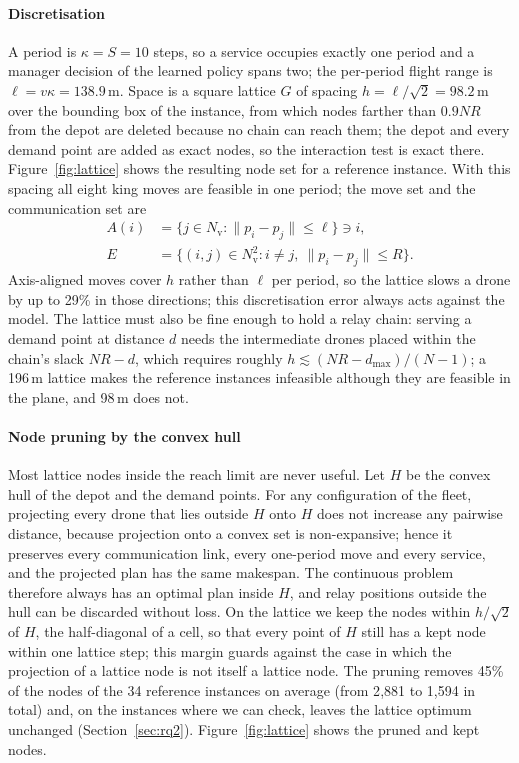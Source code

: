 \documentclass[final,5p,times,twocolumn]{elsarticle}
\begin{document}
\paragraph{Discretisation}
A period is $\kappa = S = 10$ steps, so a service occupies exactly one period and a manager
decision of the learned policy spans two; the per-period flight range is $\ell = v\kappa =
138.9$\,m. Space is a square lattice $G$ of spacing $h = \ell/\sqrt{2} = 98.2$\,m over the
bounding box of the instance, from which nodes farther than $0.9NR$ from the depot are deleted
because no chain can reach them; the depot and every demand point are added as exact nodes, so
the interaction test is exact there. Figure~\ref{fig:lattice} shows the resulting node set for a
reference instance. With this spacing all eight king moves are feasible in one period; the move
set and the communication set are
\begin{align}
A(i) &= \{ j \in N_{\mathrm{v}} : \|p_i - p_j\| \le \ell \} \ni i, \label{eq:moveset}\\
E &= \{ (i,j) \in N_{\mathrm{v}}^2 : i \ne j,\ \|p_i - p_j\| \le R \}. \label{eq:commset}
\end{align}
Axis-aligned moves cover $h$ rather than $\ell$ per period, so the lattice slows a drone by up
to 29\% in those directions; this discretisation error always acts against the model. The lattice
must also be fine enough to hold a relay chain: serving a demand point at distance $d$ needs the
intermediate drones placed within the chain's slack $NR - d$, which requires roughly
$h \lesssim (NR - d_{\max})/(N-1)$; a 196\,m lattice makes the reference instances infeasible
although they are feasible in the plane, and 98\,m does not.

\paragraph{Node pruning by the convex hull}
Most lattice nodes inside the reach limit are never useful. Let $H$ be the convex hull of the
depot and the demand points. For any configuration of the fleet, projecting every drone that lies
outside $H$ onto $H$ does not increase any pairwise distance, because projection onto a convex
set is non-expansive; hence it preserves every communication link, every one-period move and
every service, and the projected plan has the same makespan. The continuous problem therefore
always has an optimal plan inside $H$, and relay positions outside the hull can be discarded
without loss. On the lattice we keep the nodes within $h/\sqrt{2}$ of $H$, the half-diagonal of
a cell, so that every point of $H$ still has a kept node within one lattice step; this margin
guards against the case in which the projection of a lattice node is not itself a lattice node.
The pruning removes 45\% of the nodes of the 34 reference instances on average (from 2{,}881 to
1{,}594 in total) and, on the instances where we can check, leaves the lattice optimum
unchanged (Section~\ref{sec:rq2}). Figure~\ref{fig:lattice} shows the pruned and kept nodes.
\end{document}
